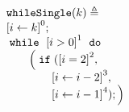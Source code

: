 \begin{example}
    \label{ex:whileSigle}
    \[
      \begin{array}{l}
          \kw{whileSingle}(k) \triangleq \\
          \clabel{ \assign{i}{k} }^{0} ; \\
              \ewhile ~ \clabel{i > 0}^{1} ~ \edo ~ \\
              \qquad \Big(
                \eif(\clabel{i = 2 }^{2}, \\
                \qquad \qquad \clabel{\assign{i}{i - 2}}^{3},\\
                \qquad \qquad \clabel{\assign{i}{i - 1}}^{4});
                \Big)
          \end{array}
      \]


\end{example}

